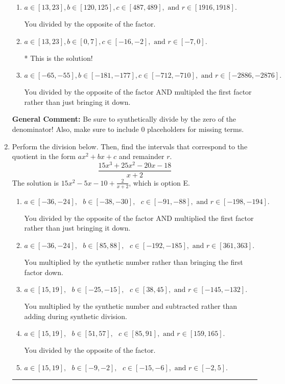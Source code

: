 \documentclass{extbook}[14pt]
\newcommand{\litem}[1]{\item #1

\rule{\textwidth}{0.4pt}}
\begin{document}
\begin{enumerate}
{\begin{enumerate}[label=\Alph*.]
 You multipled by the synthetic number rather than bringing the first factor down.
\item \( a \in [13, 23], b \in [120, 125], c \in [487, 489], \text{ and } r \in [1916, 1918]. \)

 You divided by the opposite of the factor.
\item \( a \in [13, 23], b \in [0, 7], c \in [-16, -2], \text{ and } r \in [-7, 0]. \)

* This is the solution!
\item \( a \in [-65, -55], b \in [-181, -177], c \in [-712, -710], \text{ and } r \in [-2886, -2876]. \)

 You divided by the opposite of the factor AND multipled the first factor rather than just bringing it down.
\end{enumerate}

\textbf{General Comment:} Be sure to synthetically divide by the zero of the denominator! Also, make sure to include 0 placeholders for missing terms.
}
\litem{
Perform the division below. Then, find the intervals that correspond to the quotient in the form $ax^2+bx+c$ and remainder $r$.
\[ \frac{15x^{3} +25 x^{2} -20 x -18}{x + 2} \]The solution is \( 15x^{2} -5 x -10 + \frac{2}{x + 2} \), which is option E.\begin{enumerate}[label=\Alph*.]
\item \( a \in [-36, -24], \text{   } b \in [-38, -30], \text{   } c \in [-91, -88], \text{   and   } r \in [-198, -194]. \)

 You divided by the opposite of the factor AND multiplied the first factor rather than just bringing it down.
\item \( a \in [-36, -24], \text{   } b \in [85, 88], \text{   } c \in [-192, -185], \text{   and   } r \in [361, 363]. \)

 You multiplied by the synthetic number rather than bringing the first factor down.
\item \( a \in [15, 19], \text{   } b \in [-25, -15], \text{   } c \in [38, 45], \text{   and   } r \in [-145, -132]. \)

 You multiplied by the synthetic number and subtracted rather than adding during synthetic division.
\item \( a \in [15, 19], \text{   } b \in [51, 57], \text{   } c \in [85, 91], \text{   and   } r \in [159, 165]. \)

 You divided by the opposite of the factor.
\item \( a \in [15, 19], \text{   } b \in [-9, -2], \text{   } c \in [-15, -6], \text{   and   } r \in [-2, 5]. \)


\end{enumerate}}
\end{enumerate}
\end{document}
